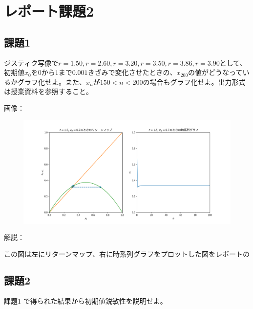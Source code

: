 \section{レポート課題2}
\subsection{課題1}
ジスティク写像で$r = 1.50, r = 2.60, r = 3.20, r = 3.50, r = 3.86, r = 3.90$として、初期値$x_0$を$0$から$1$まで$0.001$きざみで変化させたときの、$x_{200}$の値がどうなっているかグラフ化せよ。また、$x_n$が$150 < n < 200$の場合もグラフ化せよ。出力形式は授業資料を参照すること。\par
画像：
\begin{figure}[h]
  \includegraphics[width=15cm]{images/ctest2_1.png}
\end{figure}

解説：\par
この図は左にリターンマップ、右に時系列グラフをプロットした図をレポートの

\subsection{課題2}
課題1 で得られた結果から初期値鋭敏性を説明せよ。